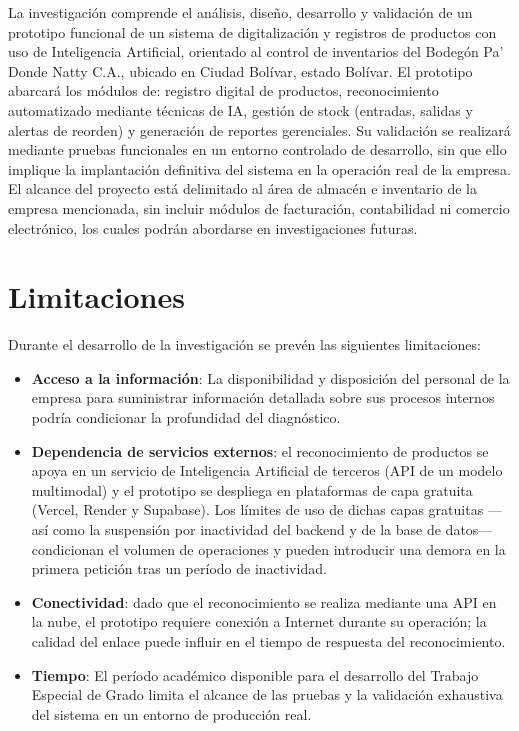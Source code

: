 \documentclass[12pt, letterpaper]{report}
\begin{document}
La investigación comprende el análisis, diseño, desarrollo y validación
de un prototipo funcional de un sistema de digitalización y registros de
productos con uso de Inteligencia Artificial, orientado al control de
inventarios del Bodegón Pa' Donde Natty C.A., ubicado en Ciudad
Bolívar, estado Bolívar. El prototipo abarcará los módulos de: registro
digital de productos, reconocimiento automatizado mediante técnicas de
IA, gestión de stock (entradas, salidas y alertas de reorden) y
generación de reportes gerenciales. Su validación se realizará mediante
pruebas funcionales en un entorno controlado de desarrollo, sin que ello
implique la implantación definitiva del sistema en la operación real de
la empresa. El alcance del proyecto está delimitado al área de almacén e
inventario de la empresa mencionada, sin incluir módulos de facturación,
contabilidad ni comercio electrónico, los cuales podrán abordarse en
investigaciones futuras.

\section{Limitaciones}

Durante el desarrollo de la investigación se prevén las siguientes
limitaciones:

\begin{itemize}
  \item \textbf{Acceso a la información}: La disponibilidad y
        disposición del personal de la empresa para suministrar
        información detallada sobre sus procesos internos podría
        condicionar la profundidad del diagnóstico.

  \item \textbf{Dependencia de servicios externos}: el reconocimiento
        de productos se apoya en un servicio de Inteligencia Artificial
        de terceros (API de un modelo multimodal) y el prototipo se
        despliega en plataformas de capa gratuita (Vercel, Render y
        Supabase). Los límites de uso de dichas capas gratuitas ---así
        como la suspensión por inactividad del backend y de la base de
        datos--- condicionan el volumen de operaciones y pueden
        introducir una demora en la primera petición tras un período de
        inactividad.

  \item \textbf{Conectividad}: dado que el reconocimiento se realiza
        mediante una API en la nube, el prototipo requiere conexión a
        Internet durante su operación; la calidad del enlace puede
        influir en el tiempo de respuesta del reconocimiento.

  \item \textbf{Tiempo}: El período académico disponible para el
        desarrollo del Trabajo Especial de Grado limita el alcance de
        las pruebas y la validación exhaustiva del sistema en un entorno
        de producción real.
\end{itemize}
\end{document}
